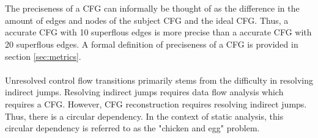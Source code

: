 \documentclass{kththesis}
\begin{document}
\\ \\
The preciseness of a CFG can informally be thought of as the difference in the amount of edges and nodes of the subject CFG and the ideal CFG. Thus, a accurate CFG with 10 superflous edges is more precise than a accurate CFG with 20 superflous edges. A formal definition of preciseness of a CFG is provided in section \ref{sec:metrics}.
\\ \\
Unresolved control flow transitions primarily stems from the difficulty in resolving indirect jumps. Resolving indirect jumps requires data flow analysis which requires a CFG. However, CFG reconstruction requires resolving indirect jumps. Thus, there is a circular dependency. In the context of static analysis, this circular dependency is referred to as the "chicken and egg" problem\cite{Jakstab}.

%
%
%
\end{document}
